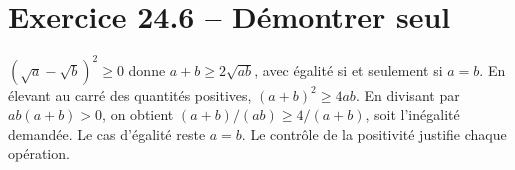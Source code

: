 \section*{Exercice 24.6 -- Démontrer seul}
$(\sqrt a-\sqrt b)^2\ge0$ donne $a+b\ge2\sqrt{ab}$, avec égalité si et seulement si $a=b$. En élevant au carré des quantités positives, $(a+b)^2\ge4ab$. En divisant par $ab(a+b)>0$, on obtient $(a+b)/(ab)\ge4/(a+b)$, soit l'inégalité demandée. Le cas d'égalité reste $a=b$. Le contrôle de la positivité justifie chaque opération.

